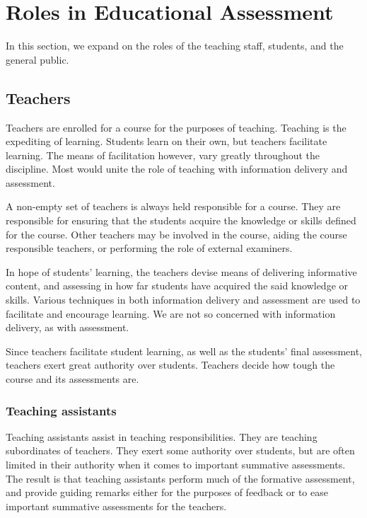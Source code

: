 
\section{Roles in Educational Assessment}

\label{section:roles-in-educational-assessment}

In this section, we expand on the roles of the teaching staff, students, and
the general public.

\subsection{Teachers}

Teachers are enrolled for a course for the purposes of teaching. Teaching is
the expediting of learning. Students learn on their own, but teachers
facilitate learning\cite{skinner-1965}. The means of facilitation however, vary
greatly throughout the discipline\cite{ramsden-1992,kember-1997}.  Most would
unite the role of teaching with information delivery and assessment.

A non-empty set of teachers is always held responsible for a course. They are
responsible for ensuring that the students acquire the knowledge or skills
defined for the course. Other teachers may be involved in the course, aiding
the course responsible teachers, or performing the role of external examiners.

In hope of students' learning, the teachers devise means of delivering
informative content, and assessing in how far students have acquired the said
knowledge or skills. Various techniques in both information delivery and
assessment are used to facilitate and encourage learning. We are not so
concerned with information delivery, as with assessment.

Since teachers facilitate student learning, as well as the students' final
assessment, teachers exert great authority over students. Teachers decide
how tough the course and its assessments are.

\subsubsection{Teaching assistants}

Teaching assistants assist in teaching responsibilities. They are teaching
subordinates of teachers. They exert some authority over students, but are
often limited in their authority when it comes to important summative
assessments. The result is that teaching assistants perform much of the
formative assessment, and provide guiding remarks either for the purposes of
feedback or to ease important summative assessments for the teachers.

